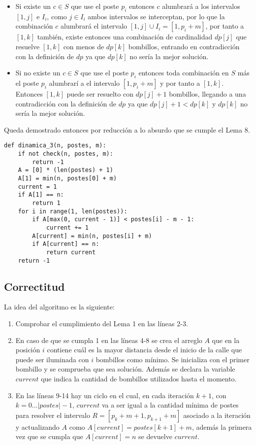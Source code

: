 \documentclass{article}
\begin{document}
\begin{itemize}
    \item Si existe un \( c \in S \) que use el poste \( p_i \) entonces \( c \) alumbrará a los intervalos \([1, j]\) e \( I_i \), como \( j \in I_i \) ambos intervalos se interceptan, por lo que la combinación \( c \) alumbrará el intervalo \([1, j] \cup I_i = [1, p_i + m]\), por tanto a \([1, k]\) también, existe entonces una combinación de cardinalidad \( dp[j] \) que resuelve \([1, k]\) con menos de \( dp[k] \) bombillos, entrando en contradicción con la definición de \( dp \) ya que \( dp[k] \) no sería la mejor solución.
    \item Si no existe un \( c \in S \) que use el poste \( p_i \) entonces toda combinación en \( S \) más el poste \( p_i \) alumbrarí
a el intervalo \([1, p_i + m]\) y por tanto a \([1, k]\). Entonces \([1, k]\) puede ser resuelto con \( dp[j] + 1 \) bombillos, llegando a una contradicción con la definición de \( dp \) ya que \( dp[j] + 1 < dp[k] \) y \( dp[k] \) no sería la mejor solución.
\end{itemize}

Queda demostrado entonces por reducción a lo absurdo que se cumple el Lema 8.

\begin{verbatim}
def dinamica_3(n, postes, m):
    if not check(n, postes, m):
        return -1
    A = [0] * (len(postes) + 1)
    A[1] = min(n, postes[0] + m)
    current = 1
    if A[1] == n:
        return 1
    for i in range(1, len(postes)):
        if A[max(0, current - 1)] < postes[i] - m - 1:
            current += 1
        A[current] = min(n, postes[i] + m)
        if A[current] == n:
            return current
    return -1
\end{verbatim}

\subsection*{Correctitud}

La idea del algoritmo es la siguiente:
\begin{enumerate}
    \item Comprobar el cumplimiento del Lema 1 en las líneas 2-3.
    \item En caso de que se cumpla 1 en las líneas 4-8 se crea el arreglo \( A \) que en la posición \( i \) contiene cuál es la mayor distancia desde el inicio de la calle que puede ser iluminada con \( i \) bombillos como mínimo. Se inicializa con el primer bombillo y se comprueba que sea solución. Además se declara la variable \( current \) que indica la cantidad de bombillos utilizados hasta el momento.
    \item En las líneas 9-14 hay un ciclo en el cual, en cada iteración \( k + 1 \), con \( k = 0 \ldots |postes| - 1 \), \( current \) va a ser igual a la cantidad mínima de postes para resolver el intervalo \( R = [p_k + m + 1, p_{k+1} + m] \) asociado a la iteración y actualizando \( A \) como \( A[current] = postes[k+1] + m \), además la primera vez que se cumpla que \( A[current] = n \) se devuelve \( current \).
\end{enumerate}
\end{document}
